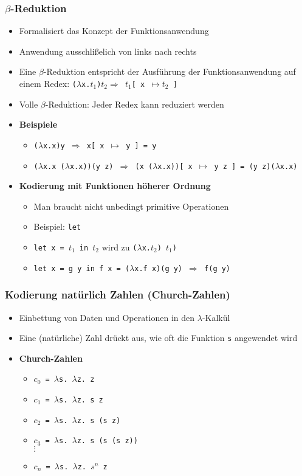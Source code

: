\subsubsection{$\beta$-Reduktion}
\begin{itemize}
	\item Formalisiert das Konzept der Funktionsanwendung
	\item Anwendung ausschlißelich von links nach rechts
	\item Eine \(\beta\)-Reduktion entspricht der Ausführung der Funktionsanwendung auf einem Redex: \texttt{(\(\lambda\)x.\(t_1\))\(t_2 \Rightarrow\) \(t_1\){[} x \(\mapsto t_2\) {]}}
	\item Volle \(\beta\)-Reduktion: Jeder Redex kann reduziert werden
	\item \textbf{Beispiele}
	\begin{itemize}
		\item \texttt{(\(\lambda\)x.x)y \(\Rightarrow\) x{[} x \(\mapsto\) y {]} = y}
		\item \texttt{(\(\lambda\)x.x (\(\lambda\)x.x))(y z) \(\Rightarrow\) (x (\(\lambda\)x.x)){[} x \(\mapsto\) y z {]} = (y z)(\(\lambda\)x.x)}
	\end{itemize}
	\item \textbf{Kodierung mit Funktionen höherer Ordnung}
	\begin{itemize}
		\item Man braucht nicht unbedingt primitive Operationen
		\item Beispiel: \texttt{let}
		\item \texttt{let x = \(t_1\) in \(t_2\)} wird zu \texttt{(\(\lambda\)x.\(t_2\)) \(t_1\))}
		\item \texttt{let x = g y in f x = (\(\lambda\)x.f x)(g y) \(\Rightarrow\) f(g y)}
	\end{itemize}
\end{itemize}

\subsubsection{Kodierung natürlich Zahlen (Church-Zahlen)}
\begin{itemize}
	\item Einbettung von Daten und Operationen in den \(\lambda\)-Kalkül
	\item Eine (natürliche) Zahl drückt aus, wie oft die Funktion \texttt{s} angewendet wird
	\item \textbf{Church-Zahlen}
	\begin{itemize}
		\item \texttt{\(c_0\) = \(\lambda\)s. \(\lambda\)z. z}
		\item \texttt{\(c_1\) = \(\lambda\)s. \(\lambda\)z. s z}
		\item \texttt{\(c_2\) = \(\lambda\)s. \(\lambda\)z. s (s z)}
		\item \texttt{\(c_3\) = \(\lambda\)s. \(\lambda\)z. s (s (s z))} \\ \(\vdots\)
		\item \texttt{\(c_n\) = \(\lambda\)s. \(\lambda\)z. \(s^n\) z}
	\end{itemize}
\end{itemize}

